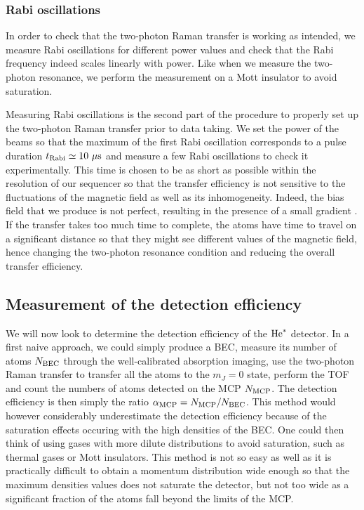 
\subsubsection{Rabi oscillations}

In order to check that the two-photon Raman transfer is working as intended, we measure Rabi oscillations for different power values and check that the Rabi frequency indeed scales linearly with power. Like when we measure the two-photon resonance, we perform the measurement on a Mott insulator to avoid saturation.


Measuring Rabi oscillations is the second part of the procedure to properly set up the two-photon Raman transfer prior to data taking. We set the power of the beams so that the maximum of the first Rabi oscillation corresponds to a pulse duration $t_{\rm{Rabi}} \simeq 10 \ \mu \rm{s}$ and measure a few Rabi oscillations to check it experimentally. This time is chosen to be as short as possible within the resolution of our sequencer so that the transfer efficiency is not sensitive to the fluctuations of the magnetic field as well as its inhomogeneity. Indeed, the bias field that we produce is not perfect, resulting in the presence of a small gradient . If the transfer takes too much time to complete, the atoms have time to travel on a significant distance so that they might see different values of the magnetic field, hence changing the two-photon resonance condition and reducing the overall transfer efficiency.

\subsection{Measurement of the detection efficiency}

We will now look to determine the detection efficiency of the $\mathrm{He}^*$ detector. In a first naive approach, we could simply produce a BEC, measure its number of atoms $N_{\rm{BEC}}$ through the well-calibrated absorption imaging, use the two-photon Raman transfer to transfer all the atoms to the $m_J=0$ state, perform the TOF and count the numbers of atoms detected on the MCP $N_{\rm{MCP}}$. The detection efficiency is then simply the ratio $\alpha_{\rm{MCP}}= N_{\rm{MCP}}/N_{\rm{BEC}}$. This method would however considerably underestimate the detection efficiency because of the saturation effects occuring with the high densities of the BEC. One could then think of using gases with more dilute distributions to avoid saturation, such as thermal gases or Mott insulators. This method is not so easy as well as it is practically difficult to obtain a momentum distribution wide enough so that the maximum densities values does not saturate the detector, but not too wide as a significant fraction of the atoms fall beyond the limits of the MCP.

